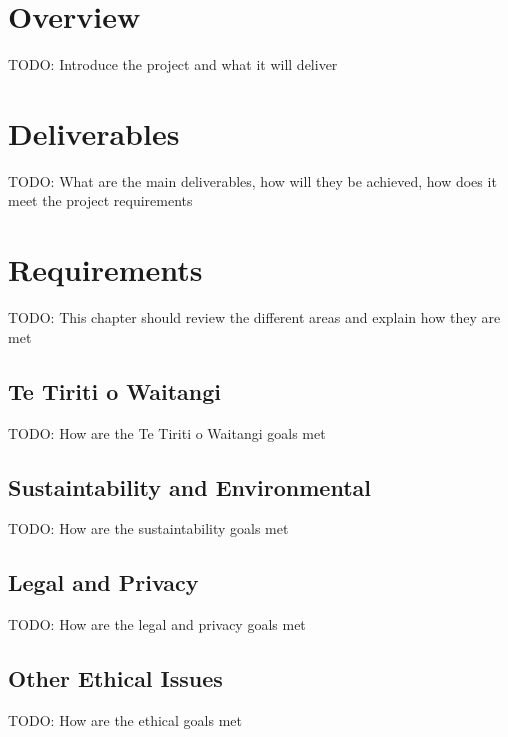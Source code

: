 
\chapter{Overview}

TODO: Introduce the project and what it will deliver

\chapter{Deliverables}

TODO: What are the main deliverables, how will they be achieved, how does it meet the project requirements

\chapter{Requirements}

TODO: This chapter should review the different areas and explain how they are met

\section{Te Tiriti o Waitangi}

TODO: How are the Te Tiriti o Waitangi goals met

\section{Sustaintability and Environmental}

TODO: How are the sustaintability goals met

\section{Legal and Privacy}

TODO: How are the legal and privacy goals met

\section{Other Ethical Issues}

TODO: How are the ethical goals met

